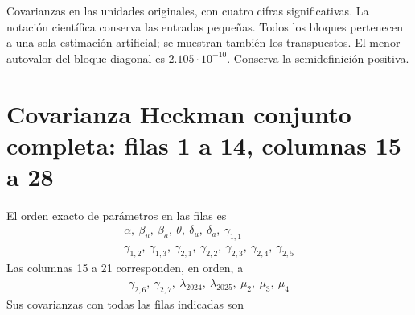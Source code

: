 \documentclass[11pt,a4paper]{article}
\begin{document}
Covarianzas en las unidades originales, con cuatro cifras significativas. La notación científica conserva las entradas pequeñas. Todos los bloques pertenecen a una sola estimación artificial; se muestran también los transpuestos.
El menor autovalor del bloque diagonal es $2.105\cdot10^{-10}$. Conserva la semidefinición positiva.
\clearpage
\section{Covarianza Heckman conjunto completa: filas 1 a 14, columnas 15 a 28}
El orden exacto de parámetros en las filas es
\[
\begin{gathered}\alpha,\ \beta_u,\ \beta_a,\ \theta,\ \delta_u,\ \delta_a,\ \gamma_{1,1}\\\gamma_{1,2},\ \gamma_{1,3},\ \gamma_{2,1},\ \gamma_{2,2},\ \gamma_{2,3},\ \gamma_{2,4},\ \gamma_{2,5}\end{gathered}
\]
Las columnas 15 a 21 corresponden, en orden, a
\[
\begin{gathered}\gamma_{2,6},\ \gamma_{2,7},\ \lambda_{2024},\ \lambda_{2025},\ \mu_2,\ \mu_3,\ \mu_4\end{gathered}
\]
Sus covarianzas con todas las filas indicadas son
\end{document}
